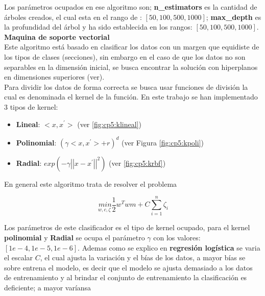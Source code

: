 Los parámetros ocupados en ese algoritmo son; \textbf{n\_estimators} es la cantidad de árboles creados, el cual esta en el rango de : $[50, 100, 500, 1000]$; \textbf{max\_depth} es la profundidad del árbol y ha sido establecida en los rangos: $[50, 100, 500, 1000]$.\\

\textbf{Maquina de soporte vectorial}\\

Este algoritmo está basado en clasificar los datos con un margen que equidiste de los tipos de clases (secciones), sin embargo en el caso de que los datos no son separables en la dimensión inicial, se busca encontrar la solución con hiperplanos en dimensiones superiores (ver).\\

Para dividir los datos de forma correcta se busca usar funciones de división la cual es denominada el kernel de la función. En este trabajo se han implementado 3 tipos de kernel: 

\begin{itemize}

	\item \textbf{Lineal}: $<x,x^{'}>$ (ver \ref{fig:cp5:klineal})

	\item \textbf{Polinomial}: $(\gamma <x,x^{'}>+r)^{d}$ (ver Figura \ref{fig:cp5:kpoli})

	\item \textbf{Radial}: $exp(-\gamma {\left|\left| x-x^{'} \right|\right|}^2)$ (ver \ref{fig:cp5:krbf})

\end{itemize}

En general este algoritmo trata de resolver el problema 

\begin{equation}
\underset{w,c,\zeta}{\ min}{\frac{1}{2}w^T  w}m+C\sum_{i=1}^{n}\zeta_i
\label{eq:cp5:msvm}
\end{equation}

Los parámetros de este clasificador es el tipo de kernel ocupado, para el kernel \textbf{polinomial} y \textbf{Radial} se ocupa el parámetro $\gamma$ con los valores: $[1e-4, 1e-5, 1e-6]$. Ademas como se explico en \textbf{regresión logística} se varia el escalar $C$, el cual ajusta la variación y el bías de los datos, a mayor bías se sobre entrena el modelo, es decir que el modelo se ajusta demasiado a los datos de entrenamiento y al brindar el conjunto de entrenamiento la clasificación es deficiente; a mayor varíansa 



